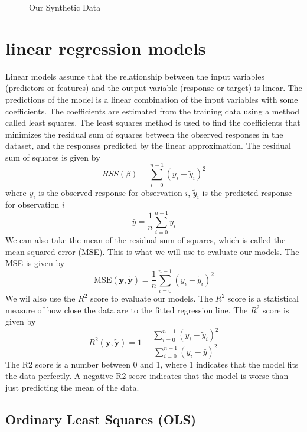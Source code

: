 \documentclass[twoside,11pt]{report}
\begin{document}
\begin{figure}[!h]
\begin{minipage}[!t]{.48\linewidth}
\begin{center}
        \caption{Our Synthetic Data}\label{fig:realdataMap}
    \end{center}
\end{minipage}
\end{figure}














\section{linear regression models }
\label{sec:models}

Linear models assume that the relationship between the input variables (predictors or features) 
and the output variable (response or target) is linear. The predictions of the model is a linear
combination of the input variables with some coefficients. The coefficients are estimated from
the training data using a method called least squares. The least squares method is used to find
the coefficients that minimizes the residual sum of squares between the observed responses in
the dataset, and the responses predicted by the linear approximation. The residual sum of squares
is given by
$$
RSS(\beta) = \sum_{i=0}^{n-1} (y_i - \tilde{y}_i)^2
$$
where $y_i$ is the observed response for observation $i$, $\tilde{y}_i$ is the predicted response for observation $i$ 
$$
\bar{y} =  \frac{1}{n} \sum_{i=0}^{n - 1} y_i
$$
We can also take the mean of the residual sum of squares, which is called the mean squared error (MSE). This is what we will use to
evaluate our models. The MSE is given by
$$
\mbox{MSE}(\mathbf{y},\mathbf{\tilde{y}}) = \frac{1}{n}
\sum_{i=0}^{n-1}(y_i-\tilde{y}_i)^2
$$
We wil also use the $R^2$ score to evaluate our models. The $R^2$ score is a statistical measure of how close the data are to the fitted regression line. The $R^2$ score is given by
$$
R^2(\mathbf{y}, \tilde{\mathbf{y}}) = 1 - \frac{\sum_{i=0}^{n - 1} (y_i - \tilde{y}_i)^2}{\sum_{i=0}^{n - 1} (y_i - \bar{y})^2}
$$
The R2 score is a number between 0 and 1, where 1 indicates that the model fits the data perfectly. 
A negative R2 score indicates that the model is worse than just predicting the mean of the data.





\subsection{Ordinary Least Squares (OLS)}
\label{sec:ols}
\end{document}
